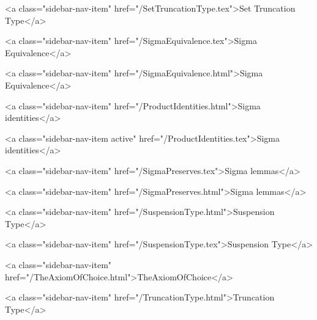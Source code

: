       
    
      
        
          <a class="sidebar-nav-item" href="/SetTruncationType.tex">Set Truncation Type</a>
        
      
    
      
        
          <a class="sidebar-nav-item" href="/SigmaEquivalence.tex">Sigma Equivalence</a>
        
      
    
      
        
          <a class="sidebar-nav-item" href="/SigmaEquivalence.html">Sigma Equivalence</a>
        
      
    
      
        
          <a class="sidebar-nav-item" href="/ProductIdentities.html">Sigma identities</a>
        
      
    
      
        
          <a class="sidebar-nav-item active" href="/ProductIdentities.tex">Sigma identities</a>
        
      
    
      
        
          <a class="sidebar-nav-item" href="/SigmaPreserves.tex">Sigma lemmas</a>
        
      
    
      
        
          <a class="sidebar-nav-item" href="/SigmaPreserves.html">Sigma lemmas</a>
        
      
    
      
        
          <a class="sidebar-nav-item" href="/SuspensionType.html">Suspension Type</a>
        
      
    
      
        
          <a class="sidebar-nav-item" href="/SuspensionType.tex">Suspension Type</a>
        
      
    
      
        
          <a class="sidebar-nav-item" href="/TheAxiomOfChoice.html">TheAxiomOfChoice</a>
        
      
    
      
        
          <a class="sidebar-nav-item" href="/TruncationType.html">Truncation Type</a>
        
